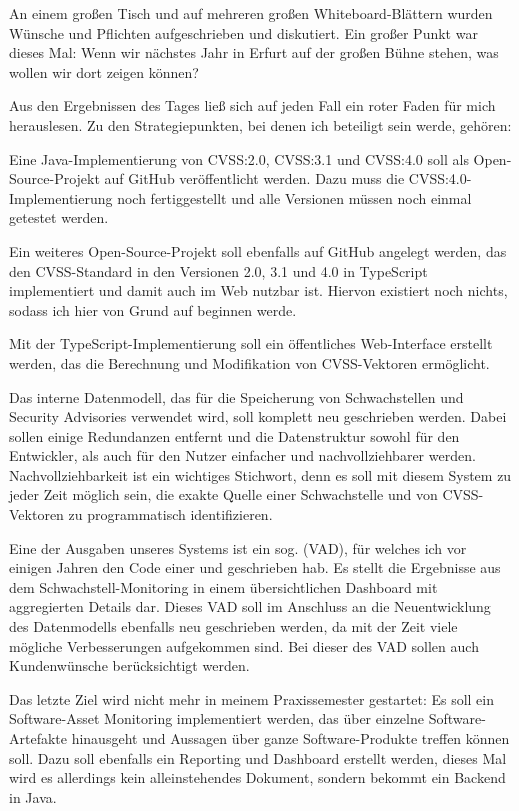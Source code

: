 An einem großen Tisch und auf mehreren großen Whiteboard-Blättern wurden Wünsche und Pflichten aufgeschrieben und diskutiert.
Ein großer Punkt war dieses Mal:
Wenn wir nächstes Jahr in Erfurt auf der großen Bühne stehen, was wollen wir dort zeigen können?

Aus den Ergebnissen des Tages ließ sich auf jeden Fall ein roter Faden für mich herauslesen.
Zu den Strategiepunkten, bei denen ich beteiligt sein werde, gehören:

\begin{smitemize}
    \item Eine Java-Implementierung von CVSS:2.0, CVSS:3.1 und CVSS:4.0 soll als Open-Source-Projekt auf GitHub veröffentlicht werden.
    Dazu muss die CVSS:4.0-Implementierung noch fertiggestellt und alle Versionen müssen noch einmal getestet werden.
    \item Ein weiteres Open-Source-Projekt soll ebenfalls auf GitHub angelegt werden, das den CVSS-Standard in den Versionen 2.0, 3.1 und 4.0 in TypeScript implementiert und damit auch im Web nutzbar ist.
    Hiervon existiert noch nichts, sodass ich hier von Grund auf beginnen werde.
    \item Mit der TypeScript-Implementierung soll ein öffentliches Web-Interface erstellt werden, das die Berechnung und Modifikation von CVSS-Vektoren ermöglicht.
    \item Das interne Datenmodell, das für die Speicherung von Schwachstellen und Security Advisories verwendet wird, soll komplett neu geschrieben werden.
    Dabei sollen einige Redundanzen entfernt und die Datenstruktur sowohl für den Entwickler, als auch für den Nutzer einfacher und nachvollziehbarer werden.
    Nachvollziehbarkeit ist ein wichtiges Stichwort, denn es soll mit diesem System zu jeder Zeit möglich sein, die exakte Quelle einer Schwachstelle und von CVSS-Vektoren zu programmatisch identifizieren.
    \item Eine der Ausgaben unseres Systems ist ein sog.  (VAD), für welches ich vor einigen Jahren den Code einer  und  geschrieben hab.
    Es stellt die Ergebnisse aus dem Schwachstell-Monitoring in einem übersichtlichen Dashboard mit aggregierten Details dar.
    Dieses VAD soll im Anschluss an die Neuentwicklung des Datenmodells ebenfalls neu geschrieben werden, da mit der Zeit viele mögliche Verbesserungen aufgekommen sind.
    Bei dieser  des VAD sollen auch Kundenwünsche berücksichtigt werden.
    \item Das letzte Ziel wird nicht mehr in meinem Praxissemester gestartet:
    Es soll ein Software-Asset Monitoring implementiert werden, das über einzelne Software-Artefakte hinausgeht und Aussagen über ganze Software-Produkte treffen können soll.
    Dazu soll ebenfalls ein Reporting und Dashboard erstellt werden, dieses Mal wird es allerdings kein alleinstehendes Dokument, sondern bekommt ein Backend in Java.
\end{smitemize}

